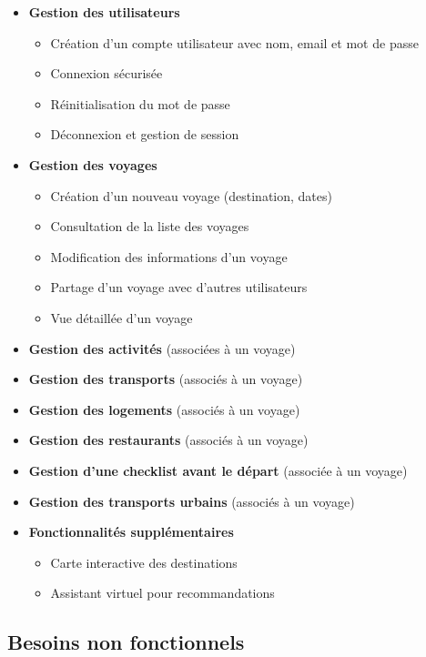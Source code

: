 \documentclass[a4paper,12pt]{article}
\begin{document}
\begin{itemize}
  \item \textbf{Gestion des utilisateurs}
  \begin{itemize}
    \item Création d'un compte utilisateur avec nom, email et mot de passe
    \item Connexion sécurisée
    \item Réinitialisation du mot de passe
    \item Déconnexion et gestion de session
  \end{itemize}

  \item \textbf{Gestion des voyages}
  \begin{itemize}
    \item Création d’un nouveau voyage (destination, dates)
    \item Consultation de la liste des voyages
    \item Modification des informations d’un voyage
    \item Partage d'un voyage avec d'autres utilisateurs
    \item Vue détaillée d'un voyage
  \end{itemize}

  \item \textbf{Gestion des activités} (associées à un voyage)
  \item \textbf{Gestion des transports} (associés à un voyage)
  \item \textbf{Gestion des logements} (associés à un voyage)
  \item \textbf{Gestion des restaurants} (associés à un voyage)
  \item \textbf{Gestion d'une checklist avant le départ} (associée à un voyage)
  \item \textbf{Gestion des transports urbains} (associés à un voyage)
  \item \textbf{Fonctionnalités supplémentaires}
  \begin{itemize}
    \item Carte interactive des destinations
    \item Assistant virtuel pour recommandations
  \end{itemize}
\end{itemize}


\subsection{Besoins non fonctionnels}
\end{document}
